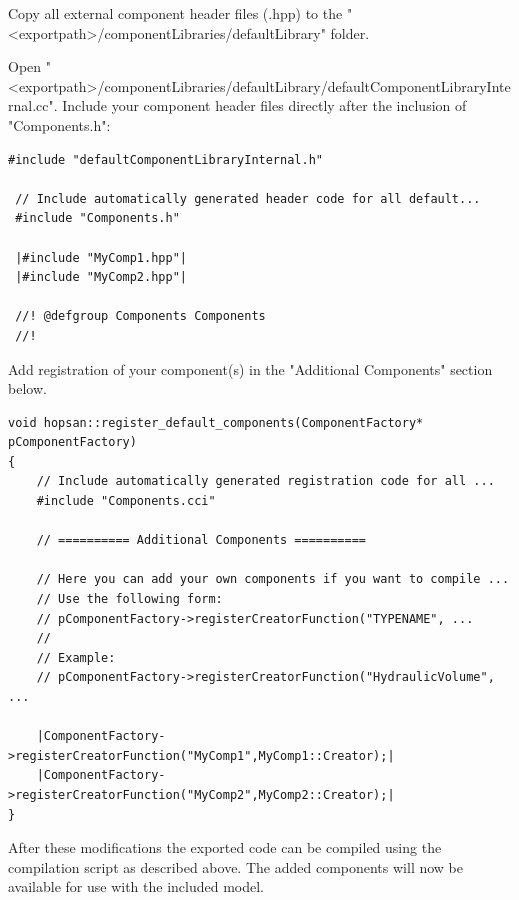 \documentclass[a4paper]{article}
\begin{document}
\begin{enumerate}
Copy all external component header files (.hpp) to the "<exportpath>/componentLibraries/defaultLibrary" folder.

Open "<exportpath>/componentLibraries/defaultLibrary/defaultComponentLibraryInternal.cc". Include your component header files directly after the inclusion of "Components.h":

\newcommand{\hilight}{\makebox[0pt][l]{%
		\color{yellow}\rule[-4pt]{1\linewidth}{14pt}}%
}



\begin{lstlisting}[style=base]
 #include "defaultComponentLibraryInternal.h"

 // Include automatically generated header code for all default...
 #include "Components.h"
 
 |#include "MyComp1.hpp"|  
 |#include "MyComp2.hpp"|

 //! @defgroup Components Components
 //!
\end{lstlisting}

Add registration of your component(s) in the "Additional Components" section below.

\begin{lstlisting}[style=base]
void hopsan::register_default_components(ComponentFactory* pComponentFactory)
{
    // Include automatically generated registration code for all ...
    #include "Components.cci"
	
    // ========== Additional Components ==========
	
    // Here you can add your own components if you want to compile ...
    // Use the following form:
    // pComponentFactory->registerCreatorFunction("TYPENAME", ...
    //
    // Example:
    // pComponentFactory->registerCreatorFunction("HydraulicVolume", ...
	
    |ComponentFactory->registerCreatorFunction("MyComp1",MyComp1::Creator);|
    |ComponentFactory->registerCreatorFunction("MyComp2",MyComp2::Creator);|
}
\end{lstlisting}
\end{enumerate}

\noindent After these modifications the exported code can be compiled using the compilation script as described above.
The added components will now be available for use with the included model.
\end{document}
